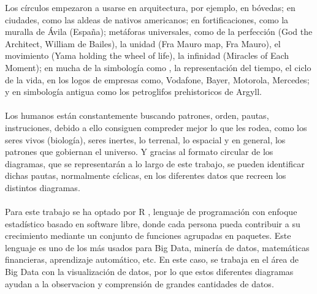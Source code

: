 \documentclass{article}\usepackage[]{graphicx}\usepackage[]{color}
\begin{document}
Los c\'irculos empezaron a usarse en arquitectura, por ejemplo, en b\'ovedas; en ciudades, como las aldeas de nativos americanos; en fortificaciones, como la muralla de \'Avila (Espa\~na); met\'aforas universales, como de la perfecci\'on (God the Architect, William de Bailes), la unidad (Fra Mauro map, Fra Mauro), el movimiento (Yama holding the wheel of life), la infinidad (Miracles of Each Moment); en mucha de la simbolog\'ia como , la representaci\'on del tiempo, el ciclo de la vida, en los logos de empresas como, Vodafone, Bayer, Motorola, Mercedes; y en simbolog\'ia antigua como los petroglifos prehistoricos de Argyll.~\\~\\
Los humanos est\'an constantemente buscando patrones, orden, pautas, instruciones, debido a ello consiguen compreder mejor lo que les rodea, como los seres vivos (biolog\'ia), seres inertes, lo terrenal, lo espacial y en general, los patrones que gobiernan el universo. Y gracias al formato circular de los diagramas, que se representar\'an a lo largo de este trabajo, se pueden identificar dichas pautas, normalmente c\'iclicas, en los diferentes datos que recreen los distintos diagramas.~\\~\\
Para este trabajo se ha optado por R%
, lenguaje de programaci\'on con enfoque estad\'istico basado en software libre, donde cada persona pueda contribuir a su crecimiento mediante un conjunto de funciones agrupadas en paquetes. Este lenguaje es uno de los m\'as usados para Big Data, miner\'ia de datos, matem\'aticas financieras, aprendizaje autom\'atico, etc. En este caso, se trabaja en el \'area de Big Data con la visualizaci\'on de datos, por lo que estos diferentes diagramas ayudan a la observacion y comprensi\'on de grandes cantidades de datos.
\clearpage
\end{document}
